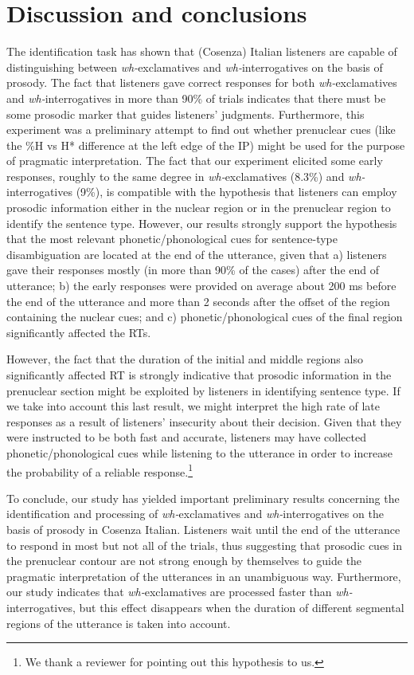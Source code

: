\documentclass[output=paper]{langsci/langscibook}
\begin{document}
\section{Discussion and conclusions}
\label{sec:kel:6}
\largerpage

The identification task has shown that (Cosenza) Italian listeners are capable of distinguishing between \textit{wh-}exclamatives and \textit{wh-}interrogatives on the basis of prosody. The fact that listeners gave correct responses for both \textit{wh-}exclamatives and \textit{wh-}interrogatives in more than 90\% of trials indicates that there must be some prosodic marker that guides listeners’ judgments. Furthermore, this experiment was a preliminary attempt to find out whether prenuclear cues (like the \%H vs H* difference at the left edge of the IP) might be used for the purpose of pragmatic interpretation. The fact that our experiment elicited some early responses, roughly to the same degree in \textit{wh-}exclamatives (8.3\%) and \textit{wh-}interrogatives (9\%), is compatible with the hypothesis that listeners can employ prosodic information either in the nuclear region or in the prenuclear region to identify the sentence type. However, our results strongly support the hypothesis that the most relevant phonetic/phonological cues for sentence-type disambiguation are located at the end of the utterance, given that a) listeners gave their responses mostly (in more than 90\% of the cases) after the end of utterance; b) the early responses were provided on average about 200 ms before the end of the utterance and more than 2 seconds after the offset of the region containing the nuclear cues; and c) phonetic/phonological cues of the final region significantly affected the RTs. 

However, the fact that the duration of the initial and middle regions also significantly affected RT is strongly indicative that prosodic information in the prenuclear section might be exploited by listeners in identifying sentence type. If we take into account this last result, we might interpret the high rate of late responses as a result of listeners’ insecurity about their decision. Given that they were instructed to be both fast and accurate, listeners may have collected phonetic/phonological cues while listening to the utterance in order to increase the probability of a reliable response.\footnote{We thank a reviewer for pointing out this hypothesis to us.}

To conclude, our study has yielded important preliminary results concerning the identification and processing of \textit{wh-}exclamatives and \textit{wh-}interrogatives on the basis of prosody in Cosenza Italian. Listeners wait until the end of the utterance to respond in most but not all of the trials, thus suggesting that prosodic cues in the prenuclear contour are not strong enough by themselves to guide the pragmatic interpretation of the utterances in an unambiguous way. Furthermore, our study indicates that \textit{wh-}exclamatives are processed faster than \textit{wh-}interrogatives, but this effect disappears when the duration of different segmental regions of the utterance is taken into account.
\end{document}
